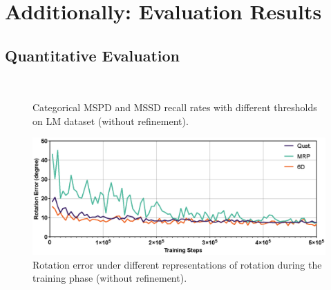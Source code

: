 \documentclass[12pt,DIV14,BCOR12mm,a4paper,footinclude=false,headinclude,parskip=half-,twoside,openright,cleardoublepage=empty,toc=index,bibliography=totoc,listof=totoc]{scrreprt}
\numberwithin{equation}{chapter}
\begin{document}
\appendix
\chapter{Additionally: Evaluation Results}
\section{Quantitative Evaluation}
\begin{figure}[H]
	\centering
	\\
  \centering
	\caption{Categorical MSPD and MSSD recall rates with different thresholds on LM dataset (without refinement).}
	\label{img:eval_threshold}
\end{figure}

\begin{figure}[H]
	\centering
	\includegraphics[width=1.\textwidth]{img/ab_rot.eps}
	\caption{Rotation error under different representations of rotation during the training phase (without refinement).}
	\label{img:ab_rot}
\end{figure}
\end{document}
